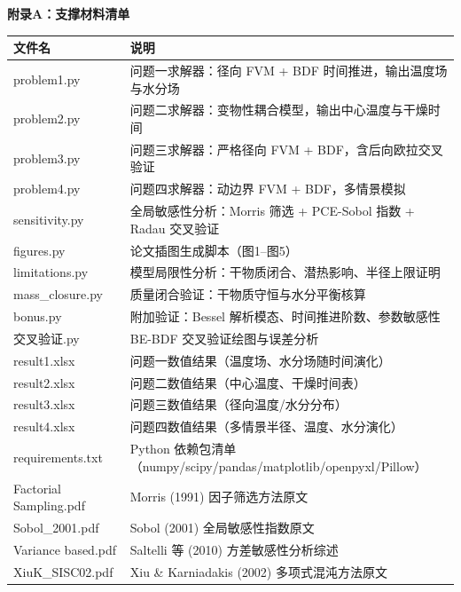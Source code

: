 \documentclass[UTF8,a4paper,12pt]{ctexart}
\begin{document}
\linespread{1.00}\selectfont
\newpage
\begin{center}
  \Large\bfseries 附录A：支撑材料清单
\end{center}
\vspace{1em}

\begin{table}[h]
\centering
\renewcommand{\arraystretch}{1.3}
\begin{tabular}{lp{10cm}}
\toprule
\textbf{文件名} & \textbf{说明} \\
\midrule
problem1.py & 问题一求解器：径向 FVM + BDF 时间推进，输出温度场与水分场 \\
problem2.py & 问题二求解器：变物性耦合模型，输出中心温度与干燥时间 \\
problem3.py & 问题三求解器：严格径向 FVM + BDF，含后向欧拉交叉验证 \\
problem4.py & 问题四求解器：动边界 FVM + BDF，多情景模拟 \\
sensitivity.py & 全局敏感性分析：Morris 筛选 + PCE-Sobol 指数 + Radau 交叉验证 \\
figures.py & 论文插图生成脚本（图1–图5） \\
limitations.py & 模型局限性分析：干物质闭合、潜热影响、半径上限证明 \\
mass\_closure.py & 质量闭合验证：干物质守恒与水分平衡核算 \\
bonus.py & 附加验证：Bessel 解析模态、时间推进阶数、参数敏感性 \\
交叉验证.py & BE-BDF 交叉验证绘图与误差分析 \\
result1.xlsx & 问题一数值结果（温度场、水分场随时间演化） \\
result2.xlsx & 问题二数值结果（中心温度、干燥时间表） \\
result3.xlsx & 问题三数值结果（径向温度/水分分布） \\
result4.xlsx & 问题四数值结果（多情景半径、温度、水分演化） \\
requirements.txt & Python 依赖包清单（numpy/scipy/pandas/matplotlib/openpyxl/Pillow） \\
Factorial Sampling.pdf & Morris (1991) 因子筛选方法原文 \\
Sobol\_2001.pdf & Sobol (2001) 全局敏感性指数原文 \\
Variance based.pdf & Saltelli 等 (2010) 方差敏感性分析综述 \\
XiuK\_SISC02.pdf & Xiu \& Karniadakis (2002) 多项式混沌方法原文 \\
\bottomrule
\end{tabular}
\end{table}
\end{document}
